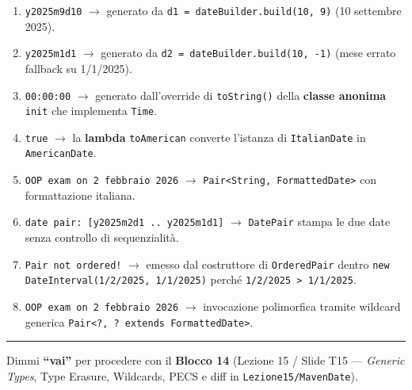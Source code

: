 \documentclass[11pt,a4paper]{article}
\newcommand{\passthrough}[1]{#1}
\providecommand{\tightlist}{\setlength{\itemsep}{0pt}\setlength{\parskip}{0pt}}
\begin{document}
\begin{enumerate}
\def\labelenumi{\arabic{enumi}.}
\tightlist
\item
  \passthrough{\lstinline!y2025m9d10!} \(\rightarrow\) generato da
  \passthrough{\lstinline!d1 = dateBuilder.build(10, 9)!} (10 settembre
  2025).
\item
  \passthrough{\lstinline!y2025m1d1!} \(\rightarrow\) generato da
  \passthrough{\lstinline!d2 = dateBuilder.build(10, -1)!} (mese errato
  fallback su 1/1/2025).
\item
  \passthrough{\lstinline!00:00:00!} \(\rightarrow\) generato
  dall'override di \passthrough{\lstinline!toString()!} della
  \textbf{classe anonima} \passthrough{\lstinline!init!} che implementa
  \passthrough{\lstinline!Time!}.
\item
  \passthrough{\lstinline!true!} \(\rightarrow\) la \textbf{lambda}
  \passthrough{\lstinline!toAmerican!} converte l'istanza di
  \passthrough{\lstinline!ItalianDate!} in
  \passthrough{\lstinline!AmericanDate!}.
\item
  \passthrough{\lstinline!OOP exam on 2 febbraio 2026!} \(\rightarrow\)
  \passthrough{\lstinline!Pair<String, FormattedDate>!} con
  formattazione italiana.
\item
  \passthrough{\lstinline!date pair: [y2025m2d1 .. y2025m1d1]!}
  \(\rightarrow\) \passthrough{\lstinline!DatePair!} stampa le due date
  senza controllo di sequenzialità.
\item
  \passthrough{\lstinline"Pair not ordered!"} \(\rightarrow\) emesso dal
  costruttore di \passthrough{\lstinline!OrderedPair!} dentro
  \passthrough{\lstinline!new DateInterval(1/2/2025, 1/1/2025)!} perché
  \passthrough{\lstinline!1/2/2025 > 1/1/2025!}.
\item
  \passthrough{\lstinline!OOP exam on 2 febbraio 2026!} \(\rightarrow\)
  invocazione polimorfica tramite wildcard generica
  \passthrough{\lstinline!Pair<?, ? extends FormattedDate>!}.
\end{enumerate}

\begin{center}\rule{0.5\linewidth}{0.5pt}\end{center}

Dimmi \textbf{``vai''} per procedere con il \textbf{Blocco 14} (Lezione
15 / Slide T15 --- \emph{Generic Types}, Type Erasure, Wildcards, PECS e
diff in \passthrough{\lstinline!Lezione15/MavenDate!}).
\end{document}
